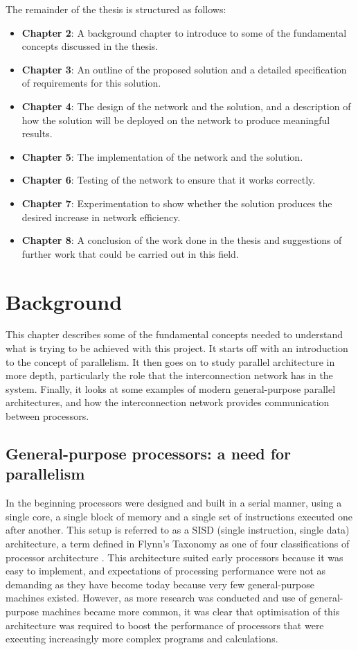 \documentclass[a4paper, 12pt]{article}
\begin{document}
The remainder of the thesis is structured as follows:
\begin{itemize}[leftmargin=0cm]
	\item[] \textbf{Chapter 2}: A background chapter to introduce to some of the fundamental concepts discussed in the thesis.
	\item[] \textbf{Chapter 3}: An outline of the proposed solution and a detailed specification of requirements for this solution.
	\item[] \textbf{Chapter 4}: The design of the network and the solution, and a description of how the solution will be deployed on the network to produce meaningful results.
	\item[] \textbf{Chapter 5}: The implementation of the network and the solution.
	\item[] \textbf{Chapter 6}: Testing of the network to ensure that it works correctly.
	\item[] \textbf{Chapter 7}: Experimentation to show whether the solution produces the desired increase in network efficiency.
	\item[] \textbf{Chapter 8}: A conclusion of the work done in the thesis and suggestions of further work that could be carried out in this field.
\end{itemize}

\newpage
\section{Background}

This chapter describes some of the fundamental concepts needed to understand what is trying to be achieved with this project. It starts off with an introduction to the concept of parallelism. It then goes on to study parallel architecture in more depth, particularly the role that the interconnection network has in the system. Finally, it looks at some examples of modern general-purpose parallel architectures, and how the interconnection network provides communication between processors.

\subsection{General-purpose processors: a need for parallelism}
\label{sec:need_parallelism}

In the beginning processors were designed and built in a serial manner, using a single core, a single block of memory and a single set of instructions executed one after another. This setup is referred to as a SISD (single instruction, single data) architecture, a term defined in Flynn's Taxonomy as one of four classifications of processor architecture \cite{Fly72}. This architecture suited early processors because it was easy to implement, and expectations of processing performance were not as demanding as they have become today because very few general-purpose machines existed. However, as more research was conducted and use of general-purpose machines became more common, it was clear that optimisation of this architecture was required to boost the performance of processors that were executing increasingly more complex programs and calculations. 
\end{document}
